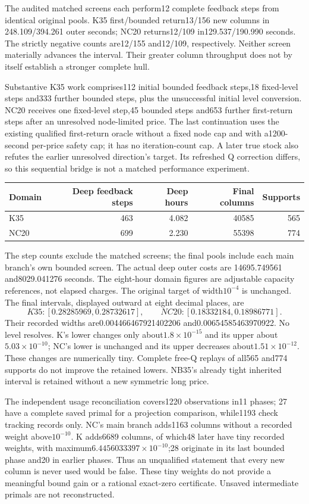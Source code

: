 The audited matched screens each perform12 complete feedback steps from
identical original pools. K35 first/bounded return13/156 new columns in
248.109/394.261 outer seconds; NC20 returns12/109 in129.537/190.990 seconds.
The strictly negative counts are12/155 and12/109, respectively. Neither
screen materially advances the interval. Their greater column throughput
does not by itself establish a stronger complete hull.

Substantive K35 work comprises112 initial bounded feedback steps,18
fixed-level steps and333 further bounded steps, plus the unsuccessful
initial level conversion. NC20 receives one fixed-level step,45 bounded
steps and653 further first-return steps after an unresolved node-limited
price. The last continuation uses the existing qualified first-return
oracle without a fixed node cap and with a1200-second per-price safety cap;
it has no iteration-count cap. A later true stock also refutes the earlier
unresolved direction's target. Its refreshed Q correction differs, so this
sequential bridge is not a matched performance experiment.

\begin{center}
\begin{tabular}{lrrrr}
Domain & Deep feedback steps & Deep hours & Final columns & Supports\\
\hline
K35 & 463 & 4.082 & 40585 & 565\\
NC20 & 699 & 2.230 & 55398 & 774\\
\end{tabular}
\end{center}
The step counts exclude the matched screens; the final pools include each
main branch's own bounded screen. The actual deep outer costs are
14695.749561 and8029.041276 seconds. The eight-hour domain figures are
adjustable capacity references, not elapsed charges. The original target
of width$10^{-4}$ is unchanged. The final intervals, displayed outward at
eight decimal places, are
\[
 K35:[0.28285969,0.28732617],\qquad
 NC20:[0.18332184,0.18986771].
\]
Their recorded widths are0.004466467921402206 and0.00654585463970922.
No level resolves. K's lower changes only about$1.8\times10^{-15}$ and its
upper about$5.03\times10^{-10}$; NC's lower is unchanged and its upper
decreases about$1.51\times10^{-12}$. These changes are numerically tiny.
Complete free-Q replays of all565 and774 supports do not improve the
retained lowers. NB35's already tight inherited interval is retained
without a new symmetric long price.

The independent usage reconciliation covers1220 observations in11 phases;
27 have a complete saved primal for a projection comparison, while1193
check tracking records only. NC's main branch adds1163 columns without a
recorded weight above$10^{-10}$. K adds6689 columns, of which48 later have
tiny recorded weights, with maximum$6.4456033397\times10^{-10}$;28 originate
in its last bounded phase and20 in earlier phases. Thus an unqualified
statement that every new column is never used would be false. These tiny
weights do not provide a meaningful bound gain or a rational exact-zero
certificate. Unsaved intermediate primals are not reconstructed.

